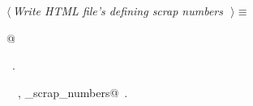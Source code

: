 \documentclass{report}
\begin{document}
\begin{flushleft} \small
\begin{minipage}{\linewidth} \label{scrap122}
$\langle\,${\it Write HTML file's defining scrap numbers}\nobreak\ {\footnotesize {}}$\,\rangle\equiv$
\vspace{-1ex}
\begin{list}{}{} \item
\mbox{}@{\NWsep}
\end{list}
\vspace{-1ex}
\footnotesize\addtolength{\baselineskip}{-1ex}
\begin{list}{}{\setlength{\itemsep}{-\parsep}\setlength{\itemindent}{-\leftmargin}}
\item \NWtxtMacroRefIn\ .
\end{list}
\vspace{-2ex}
\footnotesize\addtolength{\baselineskip}{-1ex}
\begin{list}{}{\setlength{\itemsep}{-\parsep}\setlength{\itemindent}{-\leftmargin}}
\item \NWtxtIdentsUsed\nobreak\  \verb@fputs@\nobreak\ , \verb@print_scrap_numbers@\nobreak\ .\end{list}
\end{minipage}\\[4ex]
\end{flushleft}
\end{document}
